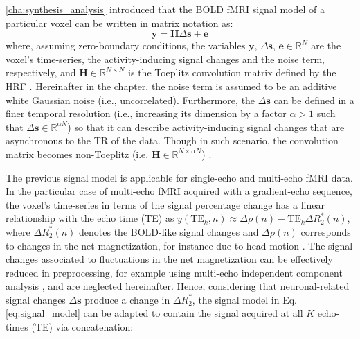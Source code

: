 \cref{cha:synthesis_analysis} introduced that the BOLD fMRI signal model of a
particular voxel can be written in matrix notation as:
\begin{equation}
    \mathbf{y} = \mathbf{H}\Delta\mathbf{s} + \mathbf{e}
    \label{eq:signal_model}
\end{equation}
where, assuming zero-boundary conditions, the variables $\mathbf{y}$, $\Delta
\mathbf{s}$, $\mathbf{e} \in \mathbb{R}^N$ are the voxel's time-series, the
activity-inducing signal changes and the noise term, respectively, and
$\mathbf{H} \in \mathbb{R}^{N \times N}$ is the Toeplitz convolution matrix
defined by the HRF
\citep{Gitelman2003Modelingregionalpsychophysiologic,Gaudes2013Paradigmfreemapping}.
Hereinafter in the chapter, the noise term is assumed to be an additive white
Gaussian noise (i.e., uncorrelated). Furthermore, the $\Delta \mathbf{s}$ can be
defined in a finer temporal resolution (i.e., increasing its dimension by a
factor $\alpha>1$ such that $\Delta \mathbf{s} \in \mathbb{R}^{\alpha N}$) so
that it can describe activity-inducing signal changes that are asynchronous to
the TR of the data. Though in such scenario, the convolution matrix becomes
non-Toeplitz (i.e. $\mathbf{H} \in \mathbb{R}^{N \times \alpha N}$)
\citep{Ciuciu2003Unsupervisedrobustnonparametric}.

The previous signal model is applicable for single-echo and multi-echo fMRI
data. In the particular case of multi-echo fMRI acquired with a gradient-echo
sequence, the voxel's time-series in terms of the signal percentage change has a
linear relationship with the echo time (TE) as $y(\mathrm{TE}_k,n) \approx
\Delta \rho(n) - \mathrm{TE}_k \Delta R_2^*(n)$,  
where $\Delta R_2^*(n)$ denotes the BOLD-like signal changes and $\Delta
\rho(n)$ corresponds to changes in the net magnetization, for instance due to
head motion \citep{Kundu2017MultiechofMRI}. The signal changes associated to
fluctuations in the net magnetization can be effectively reduced in
preprocessing, for example using multi-echo independent component analysis
\citep{Kundu2012DifferentiatingBOLDnon,CaballeroGaudes2019deconvolutionalgorithmmulti},
and are neglected hereinafter. Hence, considering that neuronal-related signal
changes $\Delta\mathbf{s}$ produce a change in $\Delta R_2^*$, the signal model
in Eq.\eqref{eq:signal_model} can be adapted to contain the signal acquired at
all $K$ echo-times (TE) via concatenation:

